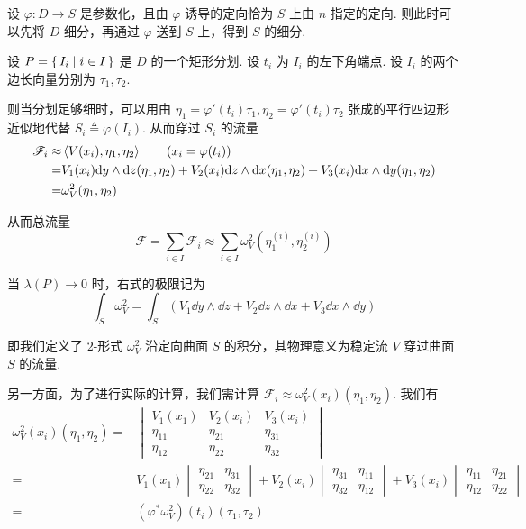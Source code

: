 设 $\varphi:D\to S$ 是参数化，且由 $\varphi$ 诱导的定向恰为 $S$ 上由 $n$ 指定的定向. 则此时可以先将 $D$ 细分，再通过 $\varphi$ 送到 $S$ 上，得到 $S$ 的细分.


设 $P=\set{I_i|i\in I}$ 是 $D$ 的一个矩形分划. 设 $t_i$ 为 $I_i$ 的左下角端点. 设 $I_i$ 的两个边长向量分别为 $\tau_1,\tau_2$.

则当分划足够细时，可以用由 $\eta_1=\varphi'(t_i)\tau_1,\eta_2=\varphi'(t_i)\tau_2$ 张成的平行四边形近似地代替 $S_i\triangleq\varphi(I_i)$. 从而穿过 $S_i$ 的流量
$$
\begin{aligned}
    \mathscr{F}_i\approx&\left\langle{V(x_i),\eta_1,\eta_2}\right\rangle\qquad(x_i=\varphi(t_i))\\
    =&V_1(x_i)\mathrm{d} y\wedge\mathrm{d} z(\eta_1,\eta_2)+V_2(x_i)\mathrm{d} z\wedge\mathrm{d} x(\eta_1,\eta_2)+V_3(x_i)\mathrm{d} x\wedge\mathrm{d} y(\eta_1,\eta_2)\\
    =&\omega_V^2(\eta_1,\eta_2)
\end{aligned}
$$

从而总流量
$$
\mathscr{F}=\sum_{i\in I}\mathscr{F}_i\approx\sum_{i\in I}\omega_V^2(\eta_1^{(i)},\eta_2^{(i)})
$$

当 $\lambda(P)\to 0$ 时，右式的极限记为
$$
\int_S\omega_V^2=\int_S(V_1\dd y\wedge\dd z+V_2\dd z\wedge\dd x+V_3\dd x\wedge\dd y)
$$

即我们定义了 $2$-形式 $\omega_V^2$ 沿定向曲面 $S$ 的积分，其物理意义为稳定流 $V$ 穿过曲面 $S$ 的流量.

另一方面，为了进行实际的计算，我们需计算 $\mathscr{F}_i\approx\omega_V^2(x_i)(\eta_1,\eta_2)$. 我们有
$$
\begin{aligned}
    \omega_V^2(x_i)(\eta_1,\eta_2)=&\begin{vmatrix}
        V_1(x_1) & V_2(x_i) & V_3(x_i)\\
        \eta_{11} & \eta_{21} & \eta_{31}\\
        \eta_{12} & \eta_{22} & \eta_{32}
    \end{vmatrix}\\
    =&V_1(x_1)\begin{vmatrix}
        \eta_{21} & \eta_{31}\\
        \eta_{22} & \eta_{32}
    \end{vmatrix}+V_2(x_i)\begin{vmatrix}
        \eta_{31} & \eta_{11}\\
        \eta_{32} & \eta_{12}
    \end{vmatrix}+V_3(x_i)\begin{vmatrix}
        \eta_{11} & \eta_{21}\\
        \eta_{12} & \eta_{22}
    \end{vmatrix}\\
    =&(\varphi^*\omega_V^2)(t_i)(\tau_1,\tau_2)
\end{aligned}
$$

